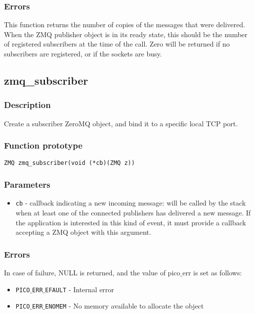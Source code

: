 \subsubsection*{Errors}
This function returns the number of copies of the messages that were delivered. When the ZMQ publisher object is in its ready state, this should be the number of registered subscribers at the time of the call.
Zero will be returned if no subscribers are registered, or if the sockets are busy.


\subsection{zmq\_subscriber}
\subsubsection*{Description}
Create a subscriber ZeroMQ object, and bind it to a specific local TCP port.

\subsubsection*{Function prototype}
\begin{verbatim}
ZMQ zmq_subscriber(void (*cb)(ZMQ z))
\end{verbatim}

\subsubsection*{Parameters}
\begin{itemize}[noitemsep]
\item \texttt{cb} - callback indicating a new incoming message: will be called by the stack when at least one of the connected publishers has delivered a new message. If the application is interested in this kind of event, it must provide a callback accepting a ZMQ object with this argument.
\end{itemize}

\subsubsection*{Errors}
In case of failure, NULL is returned, and the value of pico$\_$err
is set as follows:

\begin{itemize}[noitemsep]
\item \texttt{PICO$\_$ERR$\_$EFAULT}          - Internal error
\item \texttt{PICO$\_$ERR$\_$ENOMEM}          - No memory available to allocate the object
\end{itemize}

